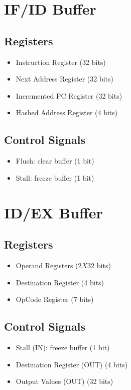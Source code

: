 \documentclass[12pt]{report}
\begin{document}
\section{IF/ID Buffer}

\subsection{Registers}
\begin{itemize}
    \item Instruction Register (32 bits)
    \item Next Address Register (32 bits)
    \item Incremented PC Register (32 bits)
    \item Hashed Address Register (4 bits)
\end{itemize}

\subsection{Control Signals}
\begin{itemize}
    \item Flush: clear buffer (1 bit)
    \item Stall: freeze buffer (1 bit)
\end{itemize}

\section{ID/EX Buffer}

\subsection{Registers}
\begin{itemize}
    \item Operand Registers (2$X$32 bits)
    \item Destination Register (4 bits)
    \item OpCode Register (7 bits)
\end{itemize}

\subsection{Control Signals}
\begin{itemize}
    \item Stall (IN): freeze buffer (1 bit)
    \item Destination Register (OUT) (4 bits)
    \item Output Values (OUT) (32 bits)
\end{itemize}
\end{document}
